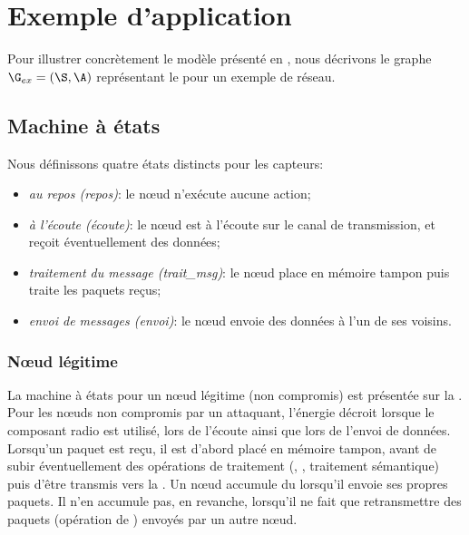\section{Exemple d'application}
\label{tj:sec:example}
Pour illustrer concrètement le modèle présenté en , nous décrivons le graphe $\G_{ex} = (\S,\A)$ représentant le  pour un exemple de réseau.

    \subsection{Machine à états}

\newcommand\idle         {\textsf{repos}\xspace}
\newcommand\listen       {\textsf{écoute}\xspace}
\newcommand\treatmsg     {\textsf{trait\_msg}\xspace}
\newcommand\treatnlmsg   {\textsf{trait}\\\textsf{msg}\xspace}
\newcommand\send         {\textsf{envoi}\xspace}
\newcommand\resend       {\textsf{renvoi}\xspace}
\newcommand\startsend    {\textsf{déb\_envoi}\xspace}
\newcommand\stopsend     {\textsf{fin\_envoi}\xspace}
\newcommand\startlisten  {\textsf{déb\_écoute}\xspace}
\newcommand\srlisten     {\textsf{déb\_éc.}\xspace}
\newcommand\stoplisten   {\textsf{fin\_écoute}\xspace}
\newcommand\startreceive {\textsf{déb\_réception}\xspace}
\newcommand\starttransmit{\textsf{déb\_retransmission}\xspace}
\newcommand\hold         {\textsf{attente}\xspace}
\newcommand\remainidle   {\textsf{cont\_repos}\xspace}
\newcommand\ignore       {\textsf{ignorer\_msg}\xspace}
Nous définissons quatre états distincts pour les capteurs:
\begin{itemize}
    \item \emph{au repos (\idle)}: le nœud n'exécute aucune action;
    \item \emph{à l'écoute (\listen)}: le nœud est à l'écoute sur le canal de transmission, et reçoit éventuellement des données;
    \item \emph{traitement du message (\treatmsg)}: le nœud place en mémoire tampon puis traite les paquets reçus;
    \item \emph{envoi de messages (\send)}: le nœud envoie des données à l'un de ses voisins.
\end{itemize}

        \subsubsection{Nœud légitime}
La machine à états pour un nœud légitime (non compromis) est présentée sur la .
Pour les nœuds non compromis par un attaquant, l'énergie décroit lorsque le composant radio est utilisé, \cad lors de l'écoute ainsi que lors de l'envoi de données.
Lorsqu'un paquet est reçu, il est d'abord placé en mémoire tampon, avant de subir éventuellement des opérations de traitement (, , traitement sémantique) puis d'être transmis vers la \sdb.
Un nœud accumule du  lorsqu'il envoie ses propres paquets.
Il n'en accumule pas, en revanche, lorsqu'il ne fait que retransmettre des paquets (opération de ) envoyés par un autre nœud.

